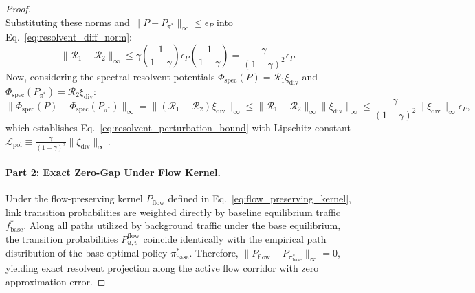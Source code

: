 \documentclass[11pt,a4paper]{article}
\begin{document}
\begin{proof}
\begin{equation}
\end{equation}
Substituting these norms and $\|P - P_{\pi^*}\|_\infty \le \epsilon_P$ into Eq.~\eqref{eq:resolvent_diff_norm}:
\begin{equation}
\|\mathcal{R}_1 - \mathcal{R}_2\|_\infty \le \gamma \left( \frac{1}{1 - \gamma} \right) \epsilon_P \left( \frac{1}{1 - \gamma} \right) = \frac{\gamma}{(1 - \gamma)^2} \epsilon_P.
\end{equation}
Now, considering the spectral resolvent potentials $\Phi_{\text{spec}}(P) = \mathcal{R}_1 \xi_{\text{div}}$ and $\Phi_{\text{spec}}(P_{\pi^*}) = \mathcal{R}_2 \xi_{\text{div}}$:
\begin{equation}
\|\Phi_{\text{spec}}(P) - \Phi_{\text{spec}}(P_{\pi^*})\|_\infty = \|(\mathcal{R}_1 - \mathcal{R}_2) \xi_{\text{div}}\|_\infty \le \|\mathcal{R}_1 - \mathcal{R}_2\|_\infty \|\xi_{\text{div}}\|_\infty \le \frac{\gamma}{(1 - \gamma)^2} \|\xi_{\text{div}}\|_\infty \epsilon_P,
\end{equation}
which establishes Eq.~\eqref{eq:resolvent_perturbation_bound} with Lipschitz constant $\mathcal{L}_{\text{pol}} \equiv \frac{\gamma}{(1 - \gamma)^2} \|\xi_{\text{div}}\|_\infty$.

\paragraph{Part 2: Exact Zero-Gap Under Flow Kernel.}
Under the flow-preserving kernel $P_{\text{flow}}$ defined in Eq.~\eqref{eq:flow_preserving_kernel}, link transition probabilities are weighted directly by baseline equilibrium traffic $f_{\text{base}}^*$. Along all paths utilized by background traffic under the base equilibrium, the transition probabilities $P_{u, v}^{\text{flow}}$ coincide identically with the empirical path distribution of the base optimal policy $\pi_{\text{base}}^*$. Therefore, $\|P_{\text{flow}} - P_{\pi_{\text{base}}^*}\|_\infty = 0$, yielding exact resolvent projection along the active flow corridor with zero approximation error.


\end{proof}
\end{document}
